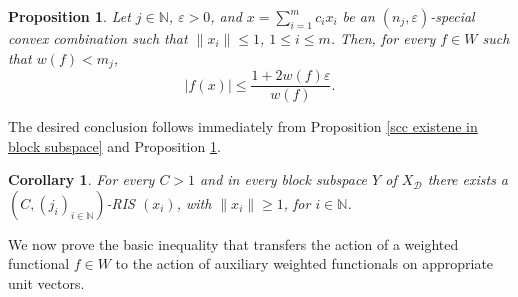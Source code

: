 \documentclass[12pt,a4paper]{amsart}
\newcommand{\N}{\mathbb{N}}
\theoremstyle{definition}
\theoremstyle{plain}
\newtheorem{proposition}[question]{Proposition}
\newtheorem{corollary}[question]{Corollary}
\begin{document}
\begin{proposition}
\label{scc RIS property}
Let $j\in\N$, $\varepsilon>0$, and $x = \sum_{i=1}^mc_ix_i$ be an $(n_j,\varepsilon)$-special convex combination such that $\|x_i\|\leq 1$, $1\leq i\leq m$. Then, for every $f\in W$ such that $w(f)<m_j$,
\[|f(x)| \leq \frac{1+2w(f)\varepsilon}{w(f)}.\]
\end{proposition}

The desired conclusion follows immediately from Proposition \ref{scc existene in block subspace} and Proposition \ref{scc RIS property}.

\begin{corollary}
\label{RIS exist}
For every $C>1$ and in every block subspace $Y$ of $X_\mathcal{D}$ there exists a $(C,(j_i)_{i\in\N})$-RIS $(x_i)$, with $\|x_i\|\geq 1$, for $i\in\N$.
\end{corollary}

 We now prove the basic inequality that transfers the action of a weighted functional $f\in W$ to the action of auxiliary weighted functionals on appropriate unit vectors.
\end{document}
